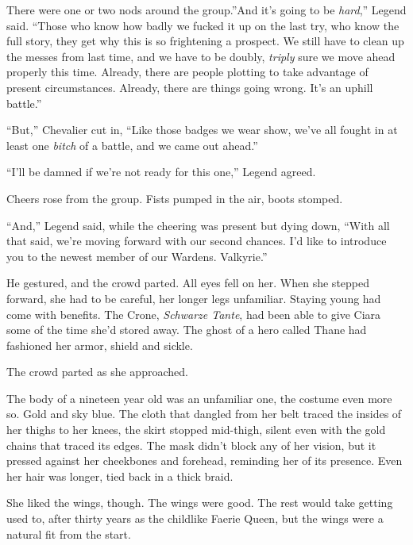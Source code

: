There were one or two nods around the group.''And it's going to be \emph{hard},'' Legend said.  ``Those who know how badly we fucked it up on the last try, who know the full story, they get why this is so frightening a prospect.  We still have to clean up the messes from last time, and we have to be doubly, \emph{triply} sure we move ahead properly this time.  Already, there are people plotting to take advantage of present circumstances.  Already, there are things going wrong.  It's an uphill battle.''



``But,'' Chevalier cut in, ``Like those badges we wear show, we've all fought in at least one \emph{bitch} of a battle, and we came out ahead.''



``I'll be damned if we're not ready for this one,'' Legend agreed.



Cheers rose from the group.  Fists pumped in the air, boots stomped.



``And,'' Legend said, while the cheering was present but dying down, ``With all that said, we're moving forward with our second chances.  I'd like to introduce you to the newest member of our Wardens.  Valkyrie.''



He gestured, and the crowd parted.  All eyes fell on her.  When she stepped forward, she had to be careful, her longer legs unfamiliar.  Staying young had come with benefits.  The Crone, \emph{Schwarze Tante}, had been able to give Ciara some of the time she'd stored away.  The ghost of a hero called Thane had fashioned her armor, shield and sickle.



The crowd parted as she approached.



The body of a nineteen year old was an unfamiliar one, the costume even more so.  Gold and sky blue.  The cloth that dangled from her belt traced the insides of her thighs to her knees, the skirt stopped mid-thigh, silent even with the gold chains that traced its edges.  The mask didn't block any of her vision, but it pressed against her cheekbones and forehead, reminding her of its presence.  Even her hair was longer, tied back in a thick braid.



She liked the wings, though.  The wings were good.  The rest would take getting used to, after thirty years as the childlike Faerie Queen, but the wings were a natural fit from the start.



